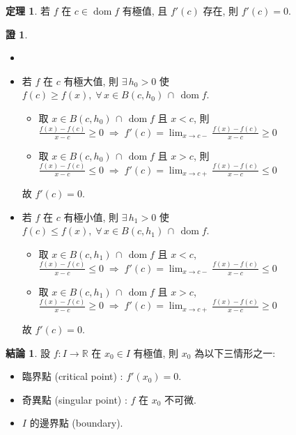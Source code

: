 \documentclass[12pt]{extarticle}
\newcommand{\ds}{\displaystyle}
\newcommand{\ie}{\;\Longrightarrow\;}
\DeclareMathOperator*{\dom}{dom}
\theoremstyle{definition}
\newtheorem*{fact}{結論}
\newtheorem*{thm}{定理}
\newtheorem*{prf}{證}
\begin{document}
\begin{thm}
  若 $f$ 在 $c\in\dom f$ 有極值, 且 $f'(c)$ 存在, 則 $f'(c) = 0$. 
\end{thm}

\begin{prf}
  \begin{itemize}\setlength\itemsep{0em}
    \item[]
    \item 若 $f$ 在 $c$ 有極大值, 則 $\ds\exists\,h_0 > 0$ 使 $\ds f(c)\geqslant f(x),\;\forall\,x\in B(c, h_0)\,\cap\,\dom{f}$. 
      \begin{itemize}\setlength\itemsep{0em}
      \item 取 $\ds x \in B(c, h_0)\,\cap\,\dom{f}$ 且 $x < c$, 則 $\ds\frac{f(x) - f(c)}{x - c} \geqslant 0 \ie f'(c) = \lim_{x\to c-}\frac{f(x) - f(c)}{x - c}\geqslant 0$
      \item 取 $\ds x \in B(c, h_0)\,\cap\,\dom{f}$ 且 $x > c$, 則 $\ds\frac{f(x) - f(c)}{x - c} \leqslant 0 \ie f'(c) = \lim_{x\to c+}\frac{f(x) - f(c)}{x - c}\leqslant 0$
    \end{itemize}
    故 $f'(c) = 0$. 
  \item 若 $f$ 在 $c$ 有極小值, 則 $\ds\exists\,h_1 > 0$ 使 $\ds f(c)\leqslant f(x),\;\forall\,x\in B(c, h_1)\,\cap\,\dom{f}$. 
    \begin{itemize}\setlength\itemsep{0em}
      \item 取 $\ds x \in B(c, h_1)\,\cap\,\dom{f}$ 且 $x < c$, $\ds\frac{f(x) - f(c)}{x - c} \leqslant 0 \ie f'(c) = \lim_{x\to c-}\frac{f(x) - f(c)}{x - c}\leqslant 0$
      \item 取 $\ds x \in B(c, h_1)\,\cap\,\dom{f}$ 且 $x > c$, $\ds\frac{f(x) - f(c)}{x - c} \geqslant 0 \ie f'(c) = \lim_{x\to c+}\frac{f(x) - f(c)}{x - c}\geqslant 0$
    \end{itemize}
    故 $f'(c) = 0$. 
  \end{itemize}
\end{prf}

\begin{fact}
  設 $f:I\to\mathbb{R}$ 在 $x_0\in I$ 有極值, 則 $x_0$ 為以下三情形之一: 
  \begin{multicols}{2}
    \begin{itemize}\setlength\itemsep{0em}
      \item 臨界點 (critical point) : $\ds f'(x_0) = 0$. 
      \item 奇異點 (singular point) : $f$ 在 $x_0$ 不可微.  
      \item $I$ 的邊界點 (boundary). 
    \end{itemize}
  \end{multicols}
\end{fact}
\end{document}
